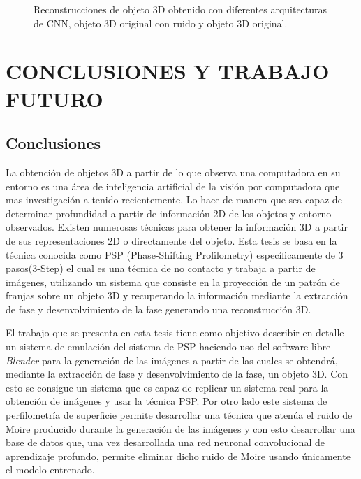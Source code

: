 \documentclass[10pt,letterpaper]{article}
\begin{document}
\begin{figure}[H]
\begin{center}
{            \label{tif146}}
        \caption{Reconstrucciones de objeto 3D obtenido con diferentes arquitecturas de CNN, objeto 3D original con ruido y objeto 3D original.}
        \label{tif98100102104106}
      \end{center}
\end{figure}





\section{CONCLUSIONES Y TRABAJO FUTURO}
\subsection{Conclusiones}

La obtención de objetos 3D a partir de lo que observa una computadora en su entorno es una área de inteligencia artificial de la visión por computadora que mas investigación a tenido recientemente. Lo hace de manera que sea capaz de determinar profundidad a partir de información 2D de los objetos y entorno observados. Existen numerosas técnicas para obtener la información 3D a partir de sus representaciones 2D o directamente del objeto. Esta tesis se basa en la técnica conocida como PSP (Phase-Shifting Profilometry) específicamente de 3 pasos(3-Step) el cual es una técnica de no contacto y trabaja a partir de imágenes, utilizando un sistema que consiste en la proyección de un patrón de franjas sobre un objeto 3D y recuperando la información mediante la extracción de fase y desenvolvimiento de la fase generando una reconstrucción 3D.

El trabajo que se presenta en esta tesis tiene como objetivo describir en detalle un sistema de emulación del sistema de PSP haciendo uso del software libre \textit{Blender} para la generación de las imágenes a partir de las cuales se obtendrá, mediante la extracción de fase y desenvolvimiento de la fase, un objeto 3D. Con esto se consigue un sistema que es capaz de replicar un sistema real para la obtención de imágenes y usar la técnica PSP. Por otro lado este sistema de perfilometría de superficie permite desarrollar una técnica que atenúa el ruido de Moire producido durante la generación de las imágenes y con esto desarrollar una base de datos que, una vez desarrollada una red neuronal convolucional de aprendizaje profundo, permite eliminar dicho ruido de Moire usando únicamente el modelo entrenado.
\end{document}
